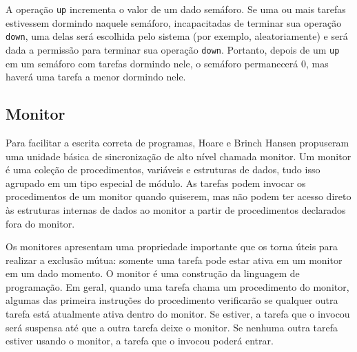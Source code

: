 A operação \texttt{up} incrementa o valor de um dado semáforo. Se uma
ou mais tarefas estivessem dormindo naquele semáforo, incapacitadas de
terminar sua operação \texttt{down}, uma delas será escolhida pelo sistema
(por exemplo, aleatoriamente) e será dada a permissão para terminar sua
operação \texttt{down}. Portanto, depois de um \texttt{up} em um semáforo
com tarefas dormindo nele, o semáforo permanecerá 0, mas haverá uma tarefa
a menor dormindo nele.

\subsection{Monitor}

Para facilitar a escrita correta de programas, Hoare e Brinch Hansen propuseram
uma unidade básica de sincronização de alto nível chamada monitor.
Um monitor é uma coleção de procedimentos, variáveis e estruturas de dados,
tudo isso agrupado em um tipo especial de módulo. As tarefas podem invocar
os procedimentos de um monitor quando quiserem, mas não podem ter acesso
direto às estruturas internas de dados ao monitor a partir de procedimentos
declarados fora do monitor.

Os monitores apresentam uma propriedade importante que os torna úteis
para realizar a exclusão mútua: somente uma tarefa pode estar ativa em um
monitor em um dado momento. O monitor é uma construção da linguagem de
programação. Em geral, quando uma tarefa chama um procedimento do monitor,
algumas das primeira instruções do procedimento verificarão se qualquer
outra tarefa está atualmente ativa dentro do monitor. Se estiver, a tarefa
que o invocou será suspensa até que a outra tarefa deixe o monitor. Se nenhuma
outra tarefa estiver usando o monitor, a tarefa que o invocou poderá entrar.

%

